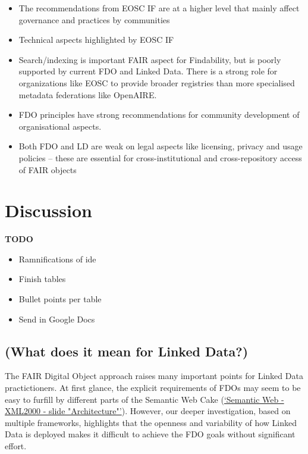 \begin{itemize}
\tightlist
\item
  The recommendations from EOSC IF are at a higher level that mainly affect governance and practices by communities
\item
  Technical aspects highlighted by EOSC IF
\item
  Search/indexing is important FAIR aspect for Findability, but is poorly supported by current FDO and Linked Data. There is a strong role for organizations like EOSC to provide broader registries than more specialised metadata federations like OpenAIRE.
\item
  FDO principles have strong recommendations for community development of organisational aspects.
\item
  Both FDO and LD are weak on legal aspects like licensing, privacy and usage policies -- these are essential for cross-institutional and cross-repository access of FAIR objects
\end{itemize}

\hypertarget{sec:discussion}{%
\section{Discussion}\label{sec:discussion}}

\textbf{TODO}

\begin{itemize}
\tightlist
\item
  Ramnifications of ide
\item
  Finish tables
\item
  Bullet points per table
\item
  Send in Google Docs
\end{itemize}

\hypertarget{what-does-it-mean-for-linked-data}{%
\subsection{(What does it mean for Linked Data?)}\label{what-does-it-mean-for-linked-data}}

The FAIR Digital Object approach raises many important points for Linked Data practictioners.
At first glance, the explicit requirements of FDOs may seem to be easy to furfill by different parts of the Semantic Web Cake (\protect\hyperlink{ref-kYjzRJ0H}{{`Semantic Web - XML2000 - slide "Architecture"'}}).
However, our deeper investigation, based on multiple frameworks, highlights that the openness and variability of how Linked Data is deployed makes it difficult to achieve the FDO goals without significant effort.

